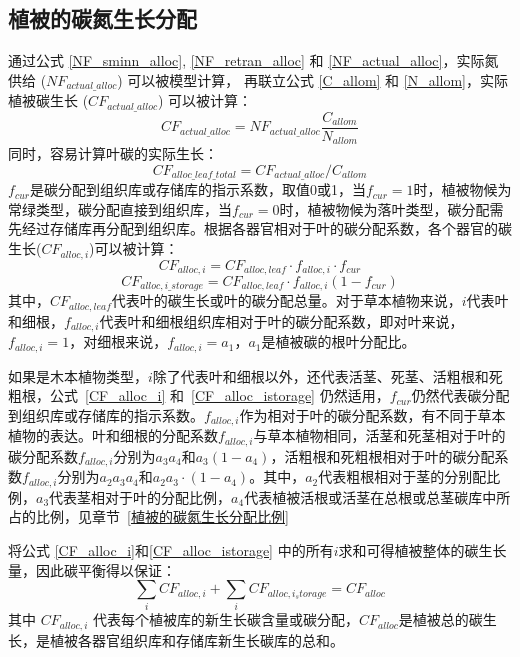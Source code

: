 \subsection{植被的碳氮生长分配}\label{植被的碳氮生长分配}
通过公式 \eqref{NF_sminn_alloc}, \eqref{NF_retran_alloc} 和 \eqref{NF_actual_alloc}，实际氮供给 ($NF_{actual\_alloc}$) 可以被模型计算，
再联立公式 \eqref{C_allom} 和 \eqref{N_allom}，实际植被碳生长 ($CF_{actual\_alloc}$) 可以被计算：
\begin{equation}
  CF_{actual\_alloc} = NF_{actual\_alloc}\frac{C_{allom}}{N_{allom}}
\end{equation}
同时，容易计算叶碳的实际生长：
\begin{equation}
  CF_{alloc\_leaf\_total} = CF_{actual\_alloc}/C_{allom}
\end{equation}
$f_{cur}$是碳分配到组织库或存储库的指示系数，取值0或1，当$f_{cur}=1$时，植被物候为常绿类型，碳分配直接到组织库，当$f_{cur}=0$时，植被物候为落叶类型，碳分配需先经过存储库再分配到组织库。根据各器官相对于叶的碳分配系数，各个器官的碳生长($CF_{alloc,i}$)可以被计算：
\begin{equation}\label{CF_alloc_i}
  CF_{alloc,i} = CF_{alloc,leaf}\cdot f_{alloc,i} \cdot f_{cur}
\end{equation}
\begin{equation}\label{CF_alloc_istorage}
  CF_{alloc,i\_storage} = CF_{alloc,leaf} \cdot f_{alloc,i} \left(1-f_{cur}\right)
\end{equation}
其中，$CF_{alloc,leaf}$代表叶的碳生长或叶的碳分配总量。对于草本植物来说，$i$代表叶和细根，$f_{alloc,i}$代表叶和细根组织库相对于叶的碳分配系数，即对叶来说，$f_{alloc,i}=1$，对细根来说，$f_{alloc,i}=a_1$，$a_1$是植被碳的根叶分配比。

如果是木本植物类型，$i$除了代表叶和细根以外，还代表活茎、死茎、活粗根和死粗根，公式~\eqref{CF_alloc_i} 和~\eqref{CF_alloc_istorage} 仍然适用，$f_{cur}$仍然代表碳分配到组织库或存储库的指示系数。$f_{alloc,i}$作为相对于叶的碳分配系数，有不同于草本植物的表达。叶和细根的分配系数$f_{alloc,i}$与草本植物相同，活茎和死茎相对于叶的碳分配系数$f_{alloc,i}$分别为$a_3a_4$和$a_3\left(1-a_4\right)$，活粗根和死粗根相对于叶的碳分配系数$f_{alloc,i}$分别为$a_2a_3a_4$和$a_2a_3\cdot \left(1-a_4\right)$。其中，$a_2$代表粗根相对于茎的分别配比例，$a_3$代表茎相对于叶的分配比例，$a_4$代表植被活根或活茎在总根或总茎碳库中所占的比例，见章节~\ref{植被的碳氮生长分配比例}

将公式 \eqref{CF_alloc_i}和\eqref{CF_alloc_istorage} 中的所有$i$求和可得植被整体的碳生长量，因此碳平衡得以保证：
\begin{equation}
  \sum_{i}{CF_{alloc,i}}+\sum_{i}{CF_{alloc,i_storage}}=CF_{alloc}
\end{equation}
其中 $CF_{alloc,i}$ 代表每个植被库的新生长碳含量或碳分配，$CF_{alloc}$是植被总的碳生长，是植被各器官组织库和存储库新生长碳库的总和。


